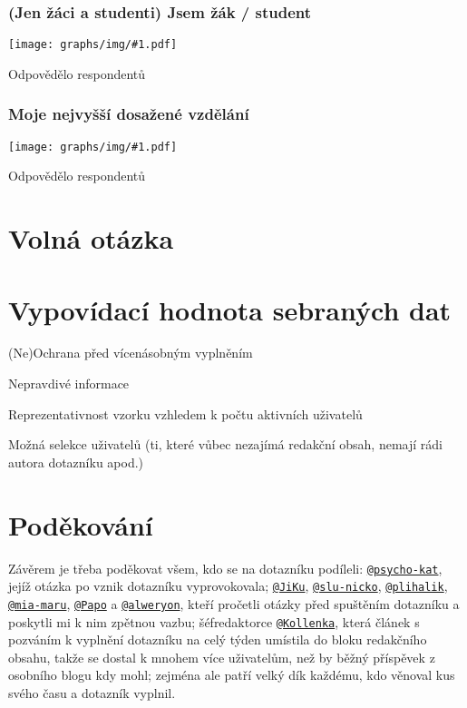 \documentclass[12pt, a4paper, twoside]{article}
\makeatletter
\newcommand{\suser}[1]{\href{https://www.signaly.cz/#1}{\texttt{@#1}}}
\newcommand{\answercount}[1]{Odpovědělo  respondentů}
\newcommand{\includegraph}[1]{
  \texttt{[image: graphs/img/\#1.pdf]}

  \answercount{#1}
}
\makeatother
\begin{document}
\subsubsection{(Jen žáci a studenti) Jsem žák / student}

\includegraph{studuji_co}

\subsubsection{Moje nejvyšší dosažené vzdělání}

\includegraph{moje_nejvyssi_dosazene_vzdelani}

\section{Volná otázka }

\section{Vypovídací hodnota sebraných dat}

(Ne)Ochrana před vícenásobným vyplněním

Nepravdivé informace

Reprezentativnost vzorku vzhledem k počtu aktivních uživatelů

Možná selekce uživatelů (ti, které vůbec nezajímá redakční obsah,
nemají rádi autora dotazníku apod.)

\section*{Poděkování}

Závěrem je třeba poděkovat všem, kdo se na dotazníku podíleli:
\suser{psycho-kat}, jejíž otázka po 
vznik dotazníku vyprovokovala;
\suser{JiKu}, \suser{slu-nicko}, \suser{plihalik}, \suser{mia-maru},
\suser{Papo} a \suser{alweryon}, kteří pročetli otázky před spuštěním
dotazníku a poskytli mi k nim zpětnou vazbu;
šéfredaktorce \suser{Kollenka}, která článek s pozváním k vyplnění
dotazníku na celý týden umístila do bloku redakčního obsahu,
takže se dostal
k mnohem více uživatelům, než by běžný příspěvek z osobního blogu
kdy mohl;
zejména ale patří velký dík každému, kdo věnoval kus svého času
a dotazník vyplnil.

\tableofcontents

\printbibliography
\end{document}
